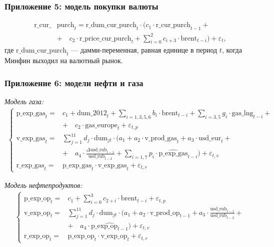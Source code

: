 \documentclass[9pt]{beamer}
\newcommand{\lsum}{\sum\limits}
\begin{document}
\begin{frame}
	\frametitle{Приложение 5: модель покупки валюты}
\begin{align*}
\text{r\_cur\_}&\text{purch}_t = \text{r\_dum\_cur\_purch}_t \cdot (c_1 \cdot \text{r\_cur\_purch}_{t-1} + \\
& + \quad c_2 \cdot \text{r\_price\_cur\_purch}_t + \lsum_{i=0}^2 c_{i+3} \cdot \text{brent}_{t-i}) + \varepsilon_{t},
\end{align*}
где $\text{r\_dum\_cur\_purch}_t$ — дамми-переменная, равная единице в период $t$, когда Минфин выходил на валютный рынок.
\end{frame}


\begin{frame}
	\frametitle{Приложение 6: модели нефти и газа}
	\footnotesize
	\textit{Модель газа:}
	\begin{align*} 
	\begin{cases}
	\text{p\_exp\_gas}_t =&c_1 + \text{dum\_2012}_t {+} \lsum_{i = 1,3,5,6}b_{i} \cdot \text{brent}_{t-i} + \lsum_{i = 3, 5} g_i \cdot \text{gas\_lng}_{t-i} + \\ 
	&+ \quad c_2 \cdot \text{gas\_europe}_t + \varepsilon_{t,p} \\
	\text{v\_exp\_gas}_t =&\lsum_{j = 1}^{11} d_j \cdot \text{dum}_{jt} \cdot(a_1 + a_2 \cdot \text{v\_prod\_gas}_{t} + a_3 \cdot \text{usd\_eur}_{t} + \\ 
	&+ \quad a_4 \cdot \frac{\Delta\text{usd\_rub}_{t-1}}{\text{usd\_rub}_{t-2}} +
	\lsum_{i = 1, 7} p_i \cdot \widehat{ \text{p\_exp\_gas}}_{t-i})+  \varepsilon_{t,v}\\
	\text{r\_exp\_gas}_t =&\text{p\_exp\_gas}_t \cdot \text{v\_exp\_gas}_t + \varepsilon_{t,r}
	\end{cases}
	\end{align*}
	
	\vspace{5mm}
	
	\textit{Модель нефтепродуктов:}
	\begin{align*} 
	\begin{cases}
	\text{p\_exp\_op}_t =&c_1 + \lsum_{i = 0}^{3}c_{2 + i} \cdot \text{brent}_{t-i} + \varepsilon_{t,p} \\
	\text{v\_exp\_op}_t =&\lsum_{j = 1}^{11} d_j \cdot \text{dum}_{jt} \cdot (a_1 + a_2 \cdot \text{v\_prod\_op}_{t-1} + a_3 \cdot \frac{\text{usd\_rub}_{t-1}}{\text{usd\_rub}_{t-2}} + \\  
	&+ \quad a_4 \cdot \widehat{ \text{p\_exp\_op}_{t-1}}) + \varepsilon_{t,v} \\
	\text{r\_exp\_op}_t =&\text{p\_exp\_op}_t \cdot \text{v\_exp\_op}_t + \varepsilon_{t,r}
	\end{cases}
	\end{align*}
\end{frame}
\end{document}
